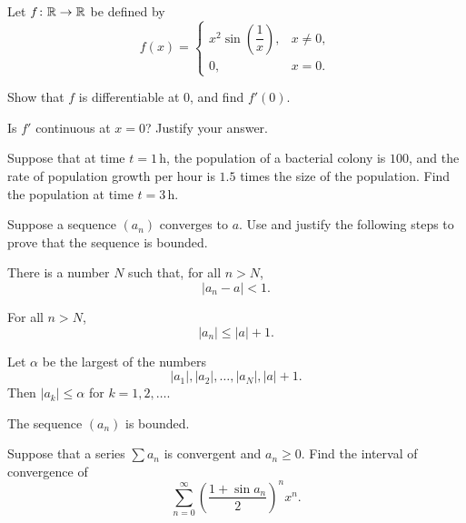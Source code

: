 \begin{problem}
Let $f\colon\mathbb{R}\to\mathbb{R}$ be defined by
\[
f(x)=
\begin{cases}
x^2\sin\!\left(\dfrac1x\right), & x\ne0,\\[0.5em]
0, & x=0.
\end{cases}
\]
\begin{problemsubparts}
\item Show that $f$ is differentiable at $0$, and find $f'(0)$.
\item Is $f'$ continuous at $x=0$? Justify your answer.
\end{problemsubparts}
\end{problem}

\begin{problem}
Suppose that at time $t=1\,\mathrm{h}$, the population of a bacterial colony is $100$, and the rate of population growth per hour is $1.5$ times the size of the population. Find the population at time $t=3\,\mathrm{h}$.
\end{problem}

\begin{problem}
Suppose a sequence $(a_n)$ converges to $a$. Use and justify the following steps to prove that the sequence is bounded.
\begin{problemsubparts}
\item There is a number $N$ such that, for all $n>N$,
\[
|a_n-a|<1.
\]
\item For all $n>N$,
\[
|a_n|\le |a|+1.
\]
\item Let $\alpha$ be the largest of the numbers
\[
|a_1|,|a_2|,\ldots,|a_N|,|a|+1.
\]
Then $|a_k|\le\alpha$ for $k=1,2,\ldots$.
\item The sequence $(a_n)$ is bounded.
\end{problemsubparts}
\end{problem}

\begin{problem}
Suppose that a series $\sum a_n$ is convergent and $a_n\ge0$. Find the interval of convergence of
\[
\sum_{n=0}^{\infty}
\left(\frac{1+\sin a_n}{2}\right)^n x^n.
\]
\end{problem}

